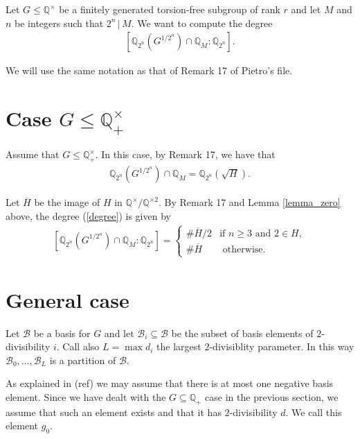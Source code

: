 \documentclass[10pt,a4paper]{article}
\theoremstyle{definition}
\begin{document}
Let $G\leq \mathbb{Q}^\times$ be a finitely generated torsion-free subgroup of rank $r$ and let $M$ and $n$ be integers such that $2^n\,|\,M$. We want to compute the degree
\begin{align}
\label{degree}
\left[\mathbb{Q}_{2^n}\left(G^{1/2^n}\right)\cap \mathbb{Q}_M:\mathbb{Q}_{2^n}\right].
\end{align}

We will use the same notation as that of Remark 17 of Pietro's file.

\section{Case $G\leq \mathbb{Q}_+^\times$}

Assume that $G\leq \mathbb{Q}_+^\times$. In this case, by Remark 17, we have that
\begin{align*}
\mathbb{Q}_{2^n}\left(G^{1/2^n}\right)\cap \mathbb{Q}_M =\mathbb{Q}_{2^n}\left(\sqrt{H}\right).
\end{align*}

Let $\overline{H}$ be the image of $H$ in $\mathbb{Q^\times}/\mathbb{Q}^{\times 2}$. By Remark 17 and Lemma \ref{lemma_zero} above, the degree (\ref{degree}) is given by
\begin{align*}
\left[\mathbb{Q}_{2^n}\left(G^{1/2^n}\right)\cap \mathbb{Q}_M:\mathbb{Q}_{2^n}\right]=
\begin{cases}
\#\overline H/2 & \text{if }n\geq 3\text{ and }2\in H,\\
\#\overline H&\text{ otherwise}.
\end{cases}
\end{align*}

\section{General case}

Let $\mathcal{B}$ be a basis for $G$ and let $\mathcal{B}_i\subseteq \mathcal{B}$ be the subset of basis elements of $2$-divisibility $i$. Call also $L=\max d_i$ the largest $2$-divisiblity parameter. In this way $\mathcal{B}_0,\dots,\mathcal{B}_L$ is a partition of $\mathcal{B}$.

As explained in ({\color{red}ref}) we may assume that there is at most one negative basis element. Since we have dealt with the $G\subseteq \mathbb{Q}_+$ case in the previous section, we assume that such an element exists and that it has $2$-divisibility $d$. We call this element $g_0$.
\end{document}
